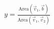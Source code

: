 \documentclass[preview]{standalone}
\begin{document}
\begin{align*}
y = \frac{\text{Area}(\vec{v}_1, \vec{b})}{\text{Area}(\vec{v}_1, \vec{v}_2)}
\end{align*}
\end{document}
